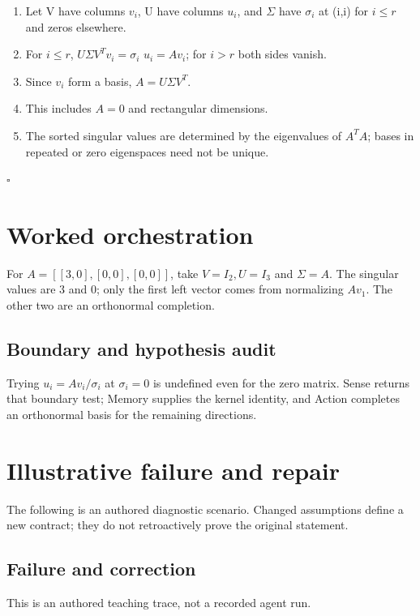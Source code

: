 \documentclass[preprint,12pt,aps,pra,showkeys,amsmath,amssymb,superscriptaddress,floatfix]{revtex4-2}
\theoremstyle{definition}
\theoremstyle{remark}
\begin{document}
\begin{enumerate}
\def\labelenumi{\arabic{enumi}.}
\item
  Let V have columns \(v_i\), U have columns \(u_i\), and \(\Sigma\)
  have \(\sigma _i\) at (i,i) for \(i\le r\) and zeros elsewhere.
\item
  For \(i\le r\), \(U\Sigma V^{T}v_i=\sigma _i\) \(u_i=Av_i\); for
  \(i>r\) both sides vanish.
\item
  Since \(v_i\) form a basis, \(A=U\Sigma V^{T}\).
\item
  This includes \(A=0\) and rectangular dimensions.
\item
  The sorted singular values are determined by the eigenvalues of
  \(A^{T}A\); bases in repeated or zero eigenspaces need not be unique.
\end{enumerate}

\hfill$\square$

\section{Worked orchestration}

For \(A=[[3,0],[0,0],[0,0]]\), take \(V=I_{2},U=I_{3}\) and
\(\Sigma =A\). The singular values are 3 and 0; only the first left
vector comes from normalizing \(Av_{1}\). The other two are an
orthonormal completion.

\subsection{Boundary and hypothesis audit}

Trying \(u_i=Av_i/\sigma _i\) at \(\sigma _i=0\) is undefined even for
the zero matrix. Sense returns that boundary test; Memory supplies the
kernel identity, and Action completes an orthonormal basis for the
remaining directions.

\section{Illustrative failure and repair}

The following is an authored diagnostic scenario. Changed assumptions
define a new contract; they do not retroactively prove the original
statement.

\subsection{Failure and correction}
This is an authored teaching trace, not a recorded agent run.
\end{document}
